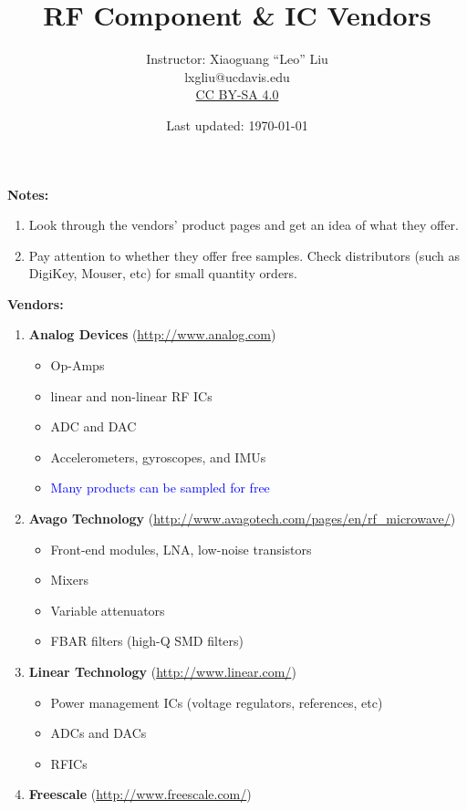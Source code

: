 \documentclass[letterpaper, 11pt]{article}
\title{RF Component \& IC Vendors}
\author{Instructor: Xiaoguang ``Leo'' Liu\\lxgliu@ucdavis.edu \\ \small \href{http://creativecommons.org/licenses/by-sa/4.0/}{CC BY-SA 4.0}}
\date{Last updated: \today}
\begin{document}
\maketitle
\textbf{\Large Notes:}
\begin{enumerate}
	\item Look through the vendors' product pages and get an idea of what they offer. 
	
	\item Pay attention to whether they offer free samples. Check distributors (such as DigiKey, Mouser, etc) for small quantity orders.
\end{enumerate}

\textbf{\Large Vendors:}

\begin{enumerate}

	\item \textbf{Analog Devices} (\url{http://www.analog.com})
		\begin{itemize}
			\item Op-Amps
			\item linear and non-linear RF ICs
			\item ADC and DAC
			\item Accelerometers, gyroscopes, and IMUs
			\item \textcolor{blue}{Many products can be sampled for free}
		\end{itemize}
	\item \textbf{Avago Technology} (\url{http://www.avagotech.com/pages/en/rf_microwave/})
		\begin{itemize}
			\item Front-end modules, LNA, low-noise transistors
			\item Mixers
			\item Variable attenuators
			\item FBAR filters (high-Q SMD filters)
		\end{itemize}		
	\item \textbf{Linear Technology} (\url{http://www.linear.com/})
		\begin{itemize}
			\item Power management ICs (voltage regulators, references, etc)
			\item ADCs and DACs
			\item RFICs
		\end{itemize}	
	\item \textbf{Freescale} (\url{http://www.freescale.com/})
		\begin{itemize}

\end{itemize}
\end{enumerate}
\end{document}
